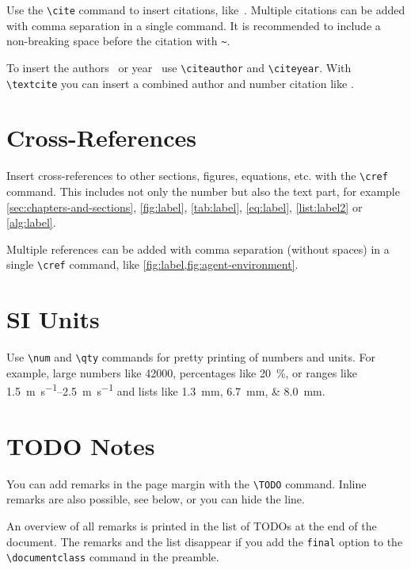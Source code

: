 Use the \texttt{\textbackslash cite} command to insert citations, like~\cite{sutton_reinforcement_2018}. Multiple citations can be added with comma separation in a single command. It is recommended to include a non-breaking space before the citation with \texttt{\textasciitilde}.

To insert the authors~\citeauthor{sutton_reinforcement_2018} or year~\citeyear{sutton_reinforcement_2018} use \texttt{\textbackslash citeauthor} and \texttt{\textbackslash citeyear}. With \texttt{\textbackslash textcite} you can insert a combined author and number citation like \textcite{sutton_reinforcement_2018}.

\section{Cross-References}
\label{sec:cross-references}

Insert cross-references to other sections, figures, equations, etc. with the \texttt{\textbackslash cref} command. This includes not only the number but also the text part, for example \cref{sec:chapters-and-sections}, \cref{fig:label}, \cref{tab:label}, \cref{eq:label}, \cref{list:label2} or \cref{alg:label}.

Multiple references can be added with comma separation (without spaces) in a single \texttt{\textbackslash cref} command, like \cref{fig:label,fig:agent-environment}.

\section{SI Units}
\label{sec:si-units}

Use \texttt{\textbackslash num} and \texttt{\textbackslash qty} commands for pretty printing of numbers and units. For example, large numbers like \num{42000}, percentages like \qty{20}{\percent}, or ranges like \qtyrange{1.5}{2.5}{\meter\per\second} and lists like \qtylist{1.3;6.7;8.0}{\milli\meter}.

\section{TODO Notes}
\label{sec:todo-notes}

You can add remarks in the page margin with the \texttt{\textbackslash TODO} command. Inline remarks are also possible, see below, or you can hide the line.

An overview of all remarks is printed in the list of TODOs at the end of the document. The remarks and the list disappear if you add the \texttt{final} option to the \texttt{\textbackslash documentclass} command in the preamble.


